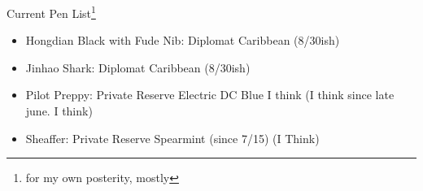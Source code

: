 \documentclass[12pt]{article}
\renewcommand{\,}{\textsuperscript{,}}
\begin{document}
Current Pen List\footnote{for my own posterity, mostly}

\begin{itemize}  
\item Hongdian Black with Fude Nib: Diplomat Caribbean (8/30ish)  
\item Jinhao Shark: Diplomat Caribbean (8/30ish)
\item Pilot Preppy: Private Reserve Electric DC Blue I think (I think since late june. I think)  
\item Sheaffer: Private Reserve Spearmint (since 7/15) (I Think)
\end{itemize}
\end{document}
